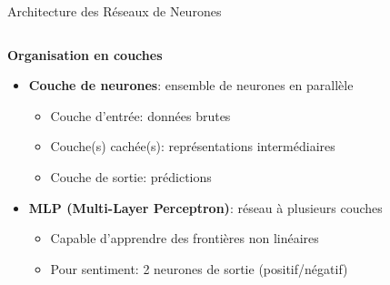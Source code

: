 \documentclass[aspectratio=169,11pt]{beamer}
\begin{document}
\begin{frame}{Architecture des Réseaux de Neurones}
    \begin{columns}
        \begin{column}{0.55\textwidth}
            \textbf{Organisation en couches}
            \begin{itemize}
                \item \textbf{Couche de neurones}: ensemble de neurones en parallèle
                \begin{itemize}
                    \item Couche d'entrée: données brutes
                    \item Couche(s) cachée(s): représentations intermédiaires
                    \item Couche de sortie: prédictions
                \end{itemize}
                \vspace{0.2cm}
                \item \textbf{MLP (Multi-Layer Perceptron)}: réseau à plusieurs couches
                \begin{itemize}
                    \item Capable d'apprendre des frontières non linéaires
                    \item Pour sentiment: 2 neurones de sortie (positif/négatif)
                \end{itemize}
            \end{itemize}
        \end{column}
        \begin{column}{0.45\textwidth}
            \begin{center}
\end{center}
\end{column}
\end{columns}
\end{frame}
\end{document}
